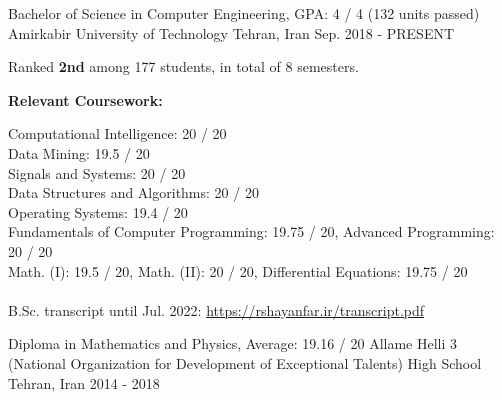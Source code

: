 

\begin{cventries}

  \cventry
    {Bachelor of Science in Computer Engineering, GPA: 4 / 4 (132 units passed)} %
    {Amirkabir University of Technology} %
    {Tehran, Iran} %
    {Sep. 2018 - PRESENT} %
    {
      \begin{cvitems}
        \item{Ranked \textbf{2nd} among 177 students, in total of 8 semesters.}
        \item{
          \textbf{Relevant Coursework:}
          \smallskip
          \begin{adjustwidth}{4mm}{}
            Computational Intelligence: 20 / 20 \\
	          Data Mining: 19.5 / 20 \\
          	Signals and Systems: 20 / 20 \\
          	Data Structures and Algorithms: 20 / 20 \\
          	Operating Systems: 19.4 / 20 \\
          	Fundamentals of Computer Programming: 19.75 / 20, Advanced Programming: 20 / 20 \\
          	Math. (I): 19.5 / 20, Math. (II): 20 / 20, Differential Equations: 19.75 / 20 \\
            \\[-2mm]
          	\textcolor{awesome-skyblue}{B.Sc. transcript until Jul. 2022: \href{https://rshayanfar.ir/transcript.pdf}{https://rshayanfar.ir/transcript.pdf}}
          \end{adjustwidth}
        }
      \end{cvitems}
    }

  \cventry
    {Diploma in Mathematics and Physics, Average: 19.16 / 20} %
    {{\fontsize{9.8pt}{1em}\bodyfont Allame Helli 3 (National Organization for Development of Exceptional Talents) High School}}
    {Tehran, Iran} %
    {2014 - 2018} %
    {}

\end{cventries}
